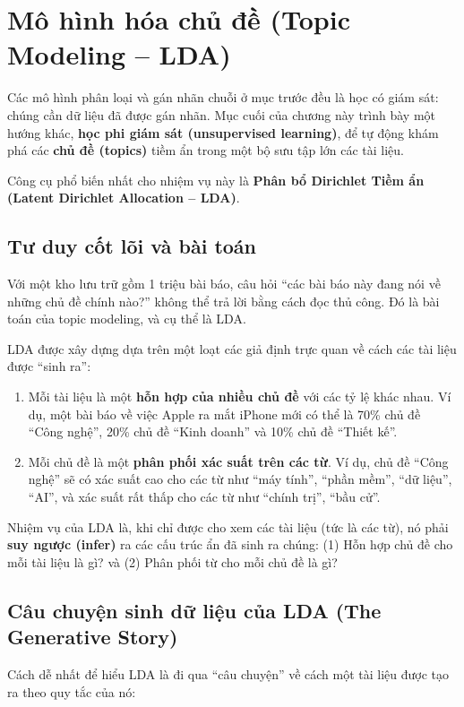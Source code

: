 
\section{Mô hình hóa chủ đề (Topic Modeling -- LDA)}
\label{sec:topic_modeling_lda}

Các mô hình phân loại và gán nhãn chuỗi ở mục trước đều là học có giám sát: chúng cần dữ liệu đã được gán nhãn. Mục cuối của chương này trình bày một hướng khác, \textbf{học phi giám sát (unsupervised learning)}, để tự động khám phá các \textbf{chủ đề (topics)} tiềm ẩn trong một bộ sưu tập lớn các tài liệu.

Công cụ phổ biến nhất cho nhiệm vụ này là \textbf{Phân bổ Dirichlet Tiềm ẩn (Latent Dirichlet Allocation -- LDA)}\cite{blei2003latent}.

\subsection{Tư duy cốt lõi và bài toán}
Với một kho lưu trữ gồm 1 triệu bài báo, câu hỏi “các bài báo này đang nói về những chủ đề chính nào?” không thể trả lời bằng cách đọc thủ công. Đó là bài toán của topic modeling, và cụ thể là LDA.

LDA được xây dựng dựa trên một loạt các giả định trực quan về cách các tài liệu được “sinh ra”:
\begin{enumerate}
    \item Mỗi tài liệu là một \textbf{hỗn hợp của nhiều chủ đề} với các tỷ lệ khác nhau. Ví dụ, một bài báo về việc Apple ra mắt iPhone mới có thể là 70\% chủ đề “Công nghệ”, 20\% chủ đề “Kinh doanh” và 10\% chủ đề “Thiết kế”.
    \item Mỗi chủ đề là một \textbf{phân phối xác suất trên các từ}. Ví dụ, chủ đề “Công nghệ” sẽ có xác suất cao cho các từ như “máy tính”, “phần mềm”, “dữ liệu”, “AI”, và xác suất rất thấp cho các từ như “chính trị”, “bầu cử”.
\end{enumerate}
Nhiệm vụ của LDA là, khi chỉ được cho xem các tài liệu (tức là các từ), nó phải \textbf{suy ngược (infer)} ra các cấu trúc ẩn đã sinh ra chúng: (1) Hỗn hợp chủ đề cho mỗi tài liệu là gì? và (2) Phân phối từ cho mỗi chủ đề là gì?

\subsection{Câu chuyện sinh dữ liệu của LDA (The Generative Story)}
Cách dễ nhất để hiểu LDA là đi qua “câu chuyện” về cách một tài liệu được tạo ra theo quy tắc của nó:

